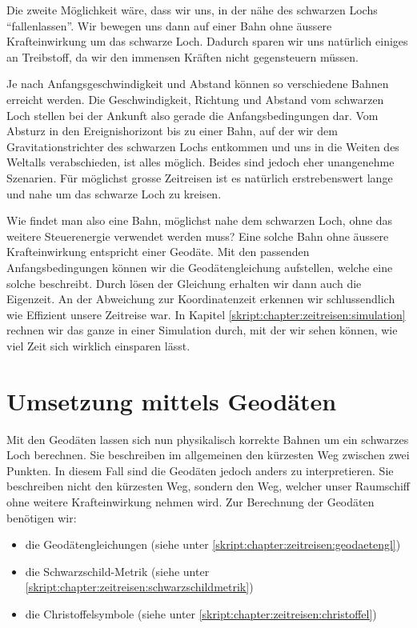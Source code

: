 \begin{refsection}
	Die zweite Möglichkeit wäre, dass wir uns, in der nähe des schwarzen Lochs ``fallenlassen''. Wir bewegen uns dann auf einer Bahn ohne äussere Krafteinwirkung um das schwarze Loch. Dadurch sparen wir uns natürlich einiges an Treibstoff, da wir den immensen Kräften nicht gegensteuern müssen. 
    
    Je nach Anfangsgeschwindigkeit und Abstand können so verschiedene Bahnen erreicht werden. Die Geschwindigkeit, Richtung und Abstand vom schwarzen Loch stellen bei der Ankunft also gerade die Anfangsbedingungen dar. Vom Absturz in den Ereignishorizont bis zu einer Bahn, auf der wir dem Gravitationstrichter des schwarzen Lochs entkommen und uns in die Weiten des Weltalls verabschieden, ist alles möglich. Beides sind jedoch eher unangenehme Szenarien. Für möglichst grosse Zeitreisen ist es natürlich erstrebenswert lange und nahe um das schwarze Loch zu kreisen.
	
	Wie findet man also eine Bahn, möglichst nahe dem schwarzen Loch, ohne das weitere Steuerenergie verwendet werden muss?
    Eine solche Bahn ohne äussere Krafteinwirkung entspricht einer Geodäte. Mit den passenden Anfangsbedingungen können wir die Geodätengleichung aufstellen, welche eine solche beschreibt. Durch lösen der Gleichung erhalten wir dann auch die Eigenzeit. An der Abweichung zur Koordinatenzeit erkennen wir schlussendlich wie Effizient unsere Zeitreise war.
    In Kapitel \ref{skript:chapter:zeitreisen:simulation} rechnen wir das ganze in einer Simulation durch, mit der wir sehen können, wie viel Zeit sich wirklich einsparen lässt.
	
	\section{Umsetzung mittels Geodäten}
	Mit den Geodäten lassen sich nun physikalisch korrekte Bahnen um ein schwarzes Loch berechnen. Sie beschreiben im allgemeinen den kürzesten Weg zwischen zwei Punkten. In diesem Fall sind die Geodäten jedoch anders zu interpretieren. Sie beschreiben nicht den kürzesten Weg, sondern den Weg, welcher unser Raumschiff ohne weitere Krafteinwirkung nehmen wird.
	Zur Berechnung der Geodäten benötigen wir:
	\begin{itemize}
		\item die Geodätengleichungen (siehe unter \ref{skript:chapter:zeitreisen:geodaetengl})
		\item die Schwarzschild-Metrik (siehe unter \ref{skript:chapter:zeitreisen:schwarzschildmetrik})
		\item die Christoffelsymbole (siehe unter \ref{skript:chapter:zeitreisen:christoffel})
	\end{itemize}


\end{refsection}

